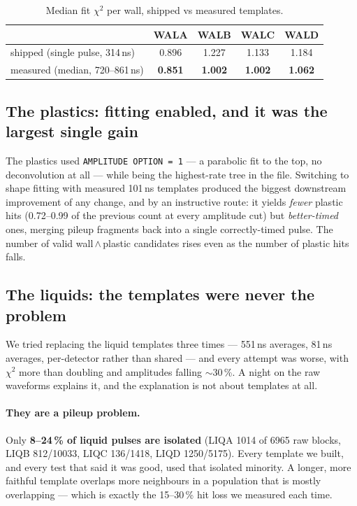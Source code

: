 \documentclass[11pt,a4paper]{article}
\begin{document}
\begin{table}[htbp]\centering\small
\caption{Median fit $\chi^2$ per wall, shipped vs measured templates.}
\begin{tabular}{lcccc}
\toprule
 & WALA & WALB & WALC & WALD \\
\midrule
shipped (single pulse, 314\,ns) & 0.896 & 1.227 & 1.133 & 1.184 \\
measured (median, 720--861\,ns) & \textbf{0.851} & \textbf{1.002} & \textbf{1.002} & \textbf{1.062} \\
\bottomrule
\end{tabular}
\end{table}

\subsection{The plastics: fitting enabled, and it was the largest single gain}

The plastics used \texttt{AMPLITUDE OPTION = 1} --- a parabolic fit to the top,
no deconvolution at all --- while being the highest-rate tree in the file.
Switching to shape fitting with measured 101\,ns templates produced the biggest
downstream improvement of any change, and by an instructive route: it yields
\emph{fewer} plastic hits (0.72--0.99 of the previous count at every amplitude
cut) but \emph{better-timed} ones, merging pileup fragments back into a single
correctly-timed pulse. The number of valid wall\,$\wedge$\,plastic candidates
rises even as the number of plastic hits falls.

\subsection{The liquids: the templates were never the problem}

We tried replacing the liquid templates three times --- 551\,ns averages,
81\,ns averages, per-detector rather than shared --- and every attempt was
worse, with $\chi^2$ more than doubling and amplitudes falling $\sim$30\,\%.
A night on the raw waveforms explains it, and the explanation is not about
templates at all.

\paragraph{They are a pileup problem.} Only \textbf{8--24\,\% of liquid pulses
are isolated} (LIQA 1014 of 6965 raw blocks, LIQB 812/10033, LIQC 136/1418,
LIQD 1250/5175). Every template we built, and every test that said it was good,
used that isolated minority. A longer, more faithful template overlaps more
neighbours in a population that is mostly overlapping --- which is exactly the
15--30\,\% hit loss we measured each time.
\end{document}
